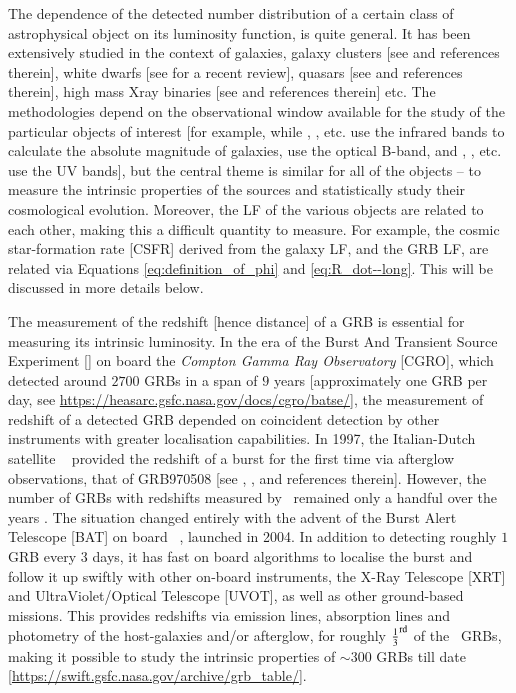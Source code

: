 The dependence of the detected number distribution of a certain class of astrophysical object on its luminosity function, is quite general. It has been extensively studied in the context of galaxies, galaxy clusters [see \cite{Galaxy_cluster_LF-2017-MNRAS} and references therein], white dwarfs [see \cite{White_dwarf_LF-2016-review} for a recent review], quasars [see \cite{Quasar_LF_in_UV-2017-MNRAS} and references therein], high mass Xray binaries [see \cite{High_mass_XRB_LF-2017-MNRAS} and references therein] etc. The methodologies depend on the observational window available for the study of the particular objects of interest [for example, while \cite{Galaxy_LF_using_WISE-2017-AJ}, \cite{Galaxy_LF_in_Kband-2017-MNRAS}, \cite{Galaxy_nearby_LF-2017-ApJ} etc. use the infrared bands to calculate the absolute magnitude of galaxies, \cite{Galaxy_LF_in_Bband-2017-A&A} use the optical B-band, and \cite{Galaxy_LF_in_UV_at_Cosmic_High_Noon-2017-ApJ}, \cite{Galaxy_primeval_LF_in_UV-2017-MNRAS}, etc. use the UV bands], but the central theme is similar for all of the objects -- to measure the intrinsic properties of the sources and statistically study their cosmological evolution. Moreover, the LF of the various objects are related to each other, making this a difficult quantity to measure. For example, the cosmic star-formation rate [CSFR] derived from the galaxy LF, and the GRB LF, are related via Equations \ref{eq:definition_of_phi} and \ref{eq:R_dot--long}. This will be discussed in more details below.

The measurement of the redshift [hence distance] of a GRB is essential for measuring its intrinsic luminosity. In the era of the Burst And Transient Source Experiment [\B] on board the \emph{Compton Gamma Ray Observatory} [CGRO], which detected around $2700$ GRBs in a span of $9$ years [approximately one GRB per day, see \url{https://heasarc.gsfc.nasa.gov/docs/cgro/batse/}], the measurement of redshift of a detected GRB depended on coincident detection by other instruments with greater localisation capabilities. In 1997, the Italian-Dutch satellite \bs\ \citep{Boella_et_al.-1997-A&AS} provided the redshift of a burst for the first time via afterglow observations, that of GRB970508 [see \cite{Costa_et_al.-1997-Nature}, \cite{Bloom_et_al.-1998-ApJ}, \cite{Fruchter_et_al.-2000-ApJ} and references therein]. However, the number of GRBs with redshifts measured by \bs\ remained only a handful over the years \citep{Amati_et_al.-2002-A&A}. The situation changed entirely with the advent of the Burst Alert Telescope [BAT] on board \s\ \citep{Gehrels_et_al.-2004-ApJ, Barthelmy_et_al.-2005-SSRv-SwiftBAT}, launched in 2004. In addition to detecting roughly $1$ GRB every $3$ days, it has fast on board algorithms to localise the burst and follow it up swiftly with other on-board instruments, the X-Ray Telescope [XRT] and UltraViolet/Optical Telescope [UVOT], as well as other ground-based missions. This provides redshifts via emission lines, absorption lines and photometry of the host-galaxies and/or afterglow, for roughly $\frac{1}{3}^{{\rm rd}}$ of the \s\ GRBs, making it possible to study the intrinsic properties of $\sim 300$ GRBs till date [\url{https://swift.gsfc.nasa.gov/archive/grb_table/}].

